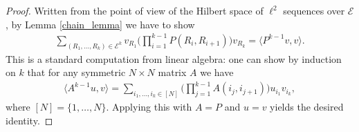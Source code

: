 \documentclass[oneside]{amsart}
\theoremstyle{definition}
\theoremstyle{plain}
\numberwithin{equation}{section}
\numberwithin{theorem}{section}
\begin{document}
\begin{proof}
  Written from the point of view of the Hilbert space of $\ell^2$ sequences over
  $\mathcal{E}$, by Lemma \ref{chain_lemma} we have to show
  \begin{align*}
    \sum_{(R_1, \dots, R_k) \in \mathcal{E}^k}
    v_{R_1} \Bigg(
    \prod_{i=1}^{k-1} P(R_i, R_{i+1})
    \Bigg) v_{R_k} = \langle P^{k-1} v, v \rangle.
  \end{align*}
  This is a standard computation from linear algebra: one can show by
  induction on $k$ that for any symmetric $N \times N$ matrix $A$ we have
  \begin{align*}
    \langle A^{k-1}u, v \rangle = \sum_{i_1, \dots, i_k \in [N]}
    \Bigg( \prod_{j=1}^{k-1} A(i_j, i_{j+1}) \Bigg) u_{i_1} v_{i_k},
  \end{align*}
  where $[N] = \{1, \dots, N\}$.
  Applying this with $A = P$ and $u = v$ yields the desired identity.
\end{proof}
\end{document}
